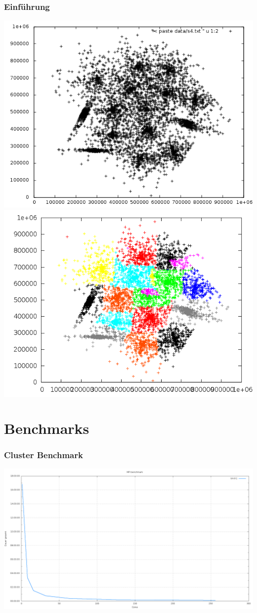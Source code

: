 \documentclass[10pt]{beamer}
\begin{document}
\begin{frame}
	\frametitle{Einf\"uhrung}
	\includegraphics[scale=0.34, keepaspectratio]{../output/pics/s4_black.png}
	\includegraphics[scale=0.34, keepaspectratio]{../output/pics/s4_colored.png}
\end{frame}

\section{Benchmarks}
\begin{frame}
	\frametitle{Cluster Benchmark}
	\includegraphics[scale=0.34, keepaspectratio]{../output/pics/benchmark.png}
\end{frame}
\end{document}
